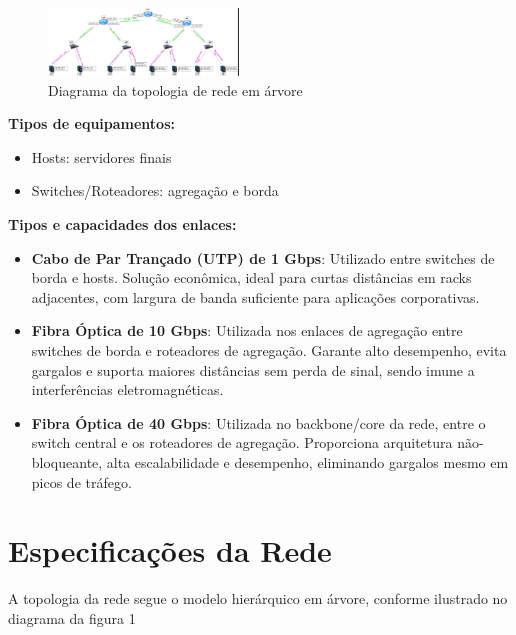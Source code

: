 \documentclass[conference,compsoc]{IEEEtran}
\begin{document}
\begin{otherlanguage}{brazil}
\begin{figure}[!h]
\centering
\includegraphics[width=0.45\textwidth]{../media/diagrama.png}
\caption{Diagrama da topologia de rede em árvore}
\label{fig:topologia_projeto2}
\end{figure}

\textbf{Tipos de equipamentos:}
\begin{itemize}
    \item Hosts: servidores finais
    \item Switches/Roteadores: agregação e borda
\end{itemize}

\textbf{Tipos e capacidades dos enlaces:}
\begin{itemize}
    \item \textbf{Cabo de Par Trançado (UTP) de 1 Gbps}: Utilizado entre switches de borda e hosts. Solução econômica, ideal para curtas distâncias em racks adjacentes, com largura de banda suficiente para aplicações corporativas.
    \item \textbf{Fibra Óptica de 10 Gbps}: Utilizada nos enlaces de agregação entre switches de borda e roteadores de agregação. Garante alto desempenho, evita gargalos e suporta maiores distâncias sem perda de sinal, sendo imune a interferências eletromagnéticas.
    \item \textbf{Fibra Óptica de 40 Gbps}: Utilizada no backbone/core da rede, entre o switch central e os roteadores de agregação. Proporciona arquitetura não-bloqueante, alta escalabilidade e desempenho, eliminando gargalos mesmo em picos de tráfego.
\end{itemize}

\section{Especificações da Rede}

A topologia da rede segue o modelo hierárquico em árvore, conforme ilustrado no diagrama da figura 1


\end{otherlanguage}
\end{document}
